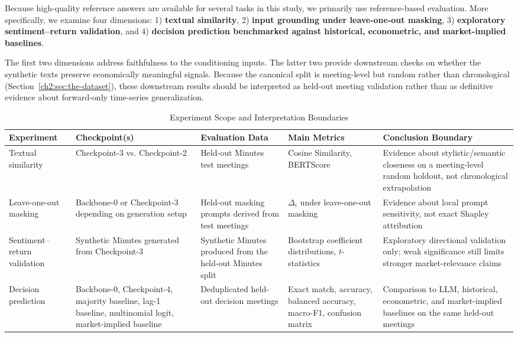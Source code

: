 Because high-quality reference answers are available for several tasks in this study, we primarily use reference-based evaluation. More specifically, we examine four dimensions: 1) \textbf{textual similarity}, 2) \textbf{input grounding under leave-one-out masking}, 3) \textbf{exploratory sentiment--return validation}, and 4) \textbf{decision prediction benchmarked against historical, econometric, and market-implied baselines}.

The first two dimensions address faithfulness to the conditioning inputs. The latter two provide downstream checks on whether the synthetic texts preserve economically meaningful signals. Because the canonical split is meeting-level but random rather than chronological (Section~\ref{ch2:sec:the-dataset}), these downstream results should be interpreted as held-out meeting validation rather than as definitive evidence about forward-only time-series generalization.

\begin{table}[htbp]
    \centering
    \footnotesize
    \begin{tabular}{p{} p{} p{} p{} p{}}
        \toprule
        \textbf{Experiment} & \textbf{Checkpoint(s)} & \textbf{Evaluation Data} & \textbf{Main Metrics} & \textbf{Conclusion Boundary} \\
        \midrule
        Textual similarity & Checkpoint-3 vs. Checkpoint-2 & Held-out Minutes test meetings & Cosine Similarity, BERTScore & Evidence about stylistic/semantic closeness on a meeting-level random holdout, not chronological extrapolation \\
        Leave-one-out masking & Backbone-0 or Checkpoint-3 depending on generation setup & Held-out masking prompts derived from test meetings & $\Delta_i$ under leave-one-out masking & Evidence about local prompt sensitivity, not exact Shapley attribution \\
        Sentiment--return validation & Synthetic Minutes generated from Checkpoint-3 & Synthetic Minutes produced from the held-out Minutes split & Bootstrap coefficient distributions, $t$-statistics & Exploratory directional validation only; weak significance still limits stronger market-relevance claims \\
        Decision prediction & Backbone-0, Checkpoint-4, majority baseline, lag-1 baseline, multinomial logit, market-implied baseline & Deduplicated held-out decision meetings & Exact match, accuracy, balanced accuracy, macro-F1, confusion matrix & Comparison to LLM, historical, econometric, and market-implied baselines on the same held-out meetings \\
        \bottomrule
    \end{tabular}
    \caption{Experiment Scope and Interpretation Boundaries}
    \label{tab:ch2:experiment_scope}
\end{table}



